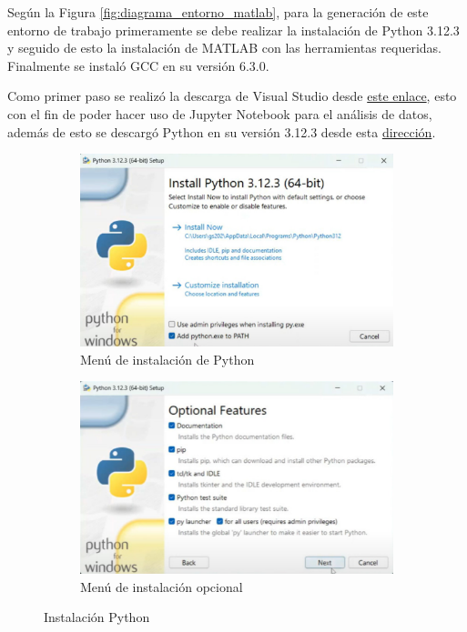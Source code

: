 Según la Figura \ref{fig:diagrama_entorno_matlab}, para la generación de este entorno de trabajo primeramente se debe realizar la instalación de Python 3.12.3 y seguido de esto la instalación de MATLAB con las herramientas requeridas. Finalmente se instaló GCC en su versión 6.3.0.

Como primer paso se realizó la descarga de Visual Studio desde \href{https://code.visualstudio.com/sha/download?build=stable&os=win32-x64-user}{este enlace}, esto con el fin de poder hacer uso de Jupyter Notebook para el análisis de datos, además de esto se descargó Python en su versión 3.12.3 desde esta \href{https://www.python.org/ftp/python/3.12.3/python-3.12.3-amd64.exe}{dirección}. 


\begin{figure}[htbp]
    \centering
    \begin{subfigure}[b]{0.45\textwidth}
        \centering
        \includegraphics[width=\textwidth]{fig/especifico_2/Ambiente_matlab/instalacion_python.pdf}
        \caption{Menú de instalación de Python}
        \label{fig:menu_python}
    \end{subfigure}
    \hfill
    \begin{subfigure}[b]{0.45\textwidth}
        \centering
        \includegraphics[width=\textwidth]{fig/especifico_2/Ambiente_matlab/opciones_adicionales_python.pdf}
        \caption{Menú de instalación opcional}
        \label{fig:menu_python_adicionales}
    \end{subfigure}
    \caption{Instalación Python}
    \label{fig:menu_python_adicionales_2}
\end{figure}


